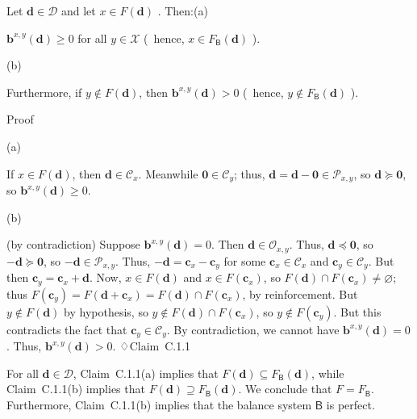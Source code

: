 \documentclass[
]{article}
\begin{document}
Let \(\mathbf{d} \in \mathcal{D}\) and let
\(x \in F\left( \mathbf{d} \right)\) . Then:(a)

\(\mathbf{b}^{x,y}\left( \mathbf{d} \right) \geq 0\) for all
\(y \in \mathcal{X}\) (~hence,
\(x \in F_{\mathsf{B}}\left( \mathbf{d} \right)\) ).

(b)

Furthermore, if \(y \notin F\left( \mathbf{d} \right)\), then
\(\mathbf{b}^{x,y}\left( \mathbf{d} \right) > 0\) (~hence,
\(y \notin F_{\mathsf{B}}\left( \mathbf{d} \right)\) ).

Proof

(a)

If \(x \in F\left( \mathbf{d} \right)\), then
\(\mathbf{d} \in \mathcal{C}_{x}\). Meanwhile
\(\mathbf{0} \in \mathcal{C}_{y}\); thus,
\(\mathbf{d} = \mathbf{d} - \mathbf{0} \in \mathcal{P}_{x,y}\), so
\(\mathbf{d} \succeq \mathbf{0}\), so
\(\mathbf{b}^{x,y}\left( \mathbf{d} \right) \geq 0\).

(b)

(by contradiction) Suppose
\(\mathbf{b}^{x,y}\left( \mathbf{d} \right) = 0\). Then
\(\mathbf{d} \in \mathcal{O}_{x,y}\). Thus,
\(\mathbf{d} \preceq \mathbf{0}\), so
\(- \mathbf{d} \succeq \mathbf{0}\), so
\(- \mathbf{d} \in \mathcal{P}_{x,y}\). Thus,
\(- \mathbf{d} = \mathbf{c}_{x} - \mathbf{c}_{y}\) for some
\(\mathbf{c}_{x} \in \mathcal{C}_{x}\) and
\(\mathbf{c}_{y} \in \mathcal{C}_{y}\). But then
\(\mathbf{c}_{y} = \mathbf{c}_{x} + \mathbf{d}\). Now,
\(x \in F\left( \mathbf{d} \right)\) and
\(x \in F\left( \mathbf{c}_{x} \right)\), so
\(F\left( \mathbf{d} \right) \cap F\left( \mathbf{c}_{x} \right) \neq \varnothing\);
thus
\(F\left( \mathbf{c}_{y} \right) = F\left( \mathbf{d} + \mathbf{c}_{x} \right) = F\left( \mathbf{d} \right) \cap F\left( \mathbf{c}_{x} \right)\),
by reinforcement. But \(y \notin F\left( \mathbf{d} \right)\) by
hypothesis, so
\(y \notin F\left( \mathbf{d} \right) \cap F\left( \mathbf{c}_{x} \right)\),
so \(y \notin F\left( \mathbf{c}_{y} \right)\). But this contradicts the
fact that \(\mathbf{c}_{y} \in \mathcal{C}_{y}\). By contradiction, we
cannot have \(\mathbf{b}^{x,y}\left( \mathbf{d} \right) = 0\). Thus,
\(\mathbf{b}^{x,y}\left( \mathbf{d} \right) > 0\). ♢Claim~C.1.1

For all \(\mathbf{d} \in \mathcal{D}\), Claim~C.1.1(a) implies that
\(F\left( \mathbf{d} \right) \subseteq F_{\mathsf{B}}\left( \mathbf{d} \right)\),
while Claim~C.1.1(b) implies that
\(F\left( \mathbf{d} \right) \supseteq F_{\mathsf{B}}\left( \mathbf{d} \right)\).
We conclude that \(F = F_{\mathsf{B}}\). Furthermore, Claim~C.1.1(b)
implies that the balance system \(\mathsf{B}\) is perfect.
\end{document}

